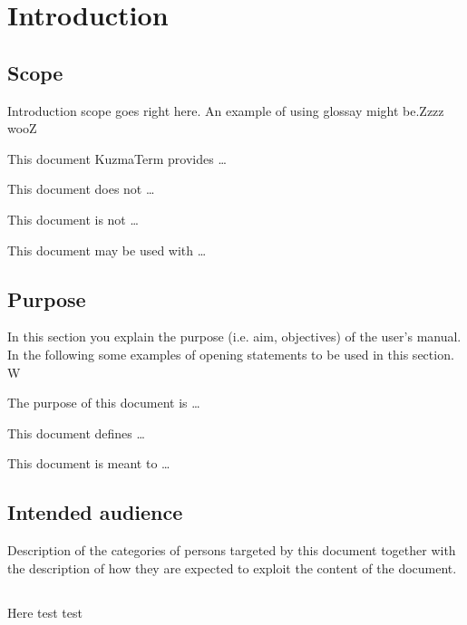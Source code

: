 \chapter{Introduction}
\label{chap:introduction}


\section{Scope}
Introduction scope goes right here. An example of using glossay might be.Zzzz
wooZ


This document \gls{KuzmaTerm}  provides \ldots


This document does not \ldots 
 
This document is not \ldots

 
This document may be used with \ldots




\section{Purpose}
In this section you explain the purpose (i.e. aim, objectives) of the user's
manual. In the following some examples of opening statements to be used in this
section. W  

The purpose of this document is \ldots

This document defines \ldots

This document is meant to \ldots



\section{Intended audience}
Description of the categories of persons targeted by this document together with the description of how they are expected to exploit the content of the document.


\section{\mysystemname}
Here test test

